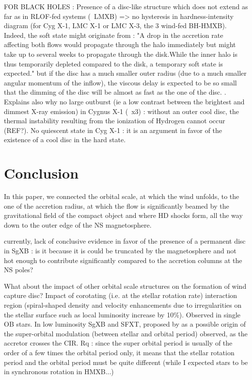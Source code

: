 \documentclass{aa}
\makeatletter
\newcommand{\sgx}{SgXB\xspace}
\newcommand*{\hmxb}{HMXB\@\xspace}
\newcommand*{\ns}{NS\@\xspace}
\newcommand*{\ie}{i.e.\@\xspace}
\makeatother
\begin{document}
FOR BLACK HOLES :
Presence of a disc-like structure which does not extend as far as in RLOF-fed systems (~LMXB) => no hysteresis in hardness-intensity diagram (for Cyg X-1, LMC X-1 or LMC X-3, the 3 wind-fed BH-HMXB). Indeed, the soft state might originate from : "A drop in the accretion rate affecting both flows would propagate through the halo immediately but might take up to several weeks to propagate through the disk.While the inner halo is thus temporarily depleted compared to the disk, a temporary soft state is expected." but if the disc has a much smaller outer radius (due to a much smaller angular momentum of the inflow), the viscous delay is expected to be so small that the dimming of the disc will be almost as fast as the one of the disc. \citep{Smith2002}. Explains also why no large outburst (ie a low contrast between the brightest and dimmest X-ray emission) in Cygnus X-1 (~x3) \citep{Grinberg:2014ux} : without an outer cool disc, the thermal instability resulting from the ionization of Hydrogen cannot occur (REF?). No quiescent state in Cyg X-1 : it is an argument in favor of the existence of a cool disc in the hard state.

\section{Conclusion}
\label{sec:conc}

In this paper, we connected the orbital scale, at which the wind unfolds, to the one of the accretion radius, at which the flow is significantly beamed by the gravitational field of the compact object and where HD shocks form, all the way down to the outer edge of the \ns magnetosphere.  

currently, lack of conclusive evidence in favor of the presence of a permanent disc in \sgx \citep{Bozzo2008,Shakura2012,Romano2015,Hu2017} : is it because it is could be truncated by the magnetosphere and not hot enough to contribute significantly compared to the accretion columns at the NS poles?

What about the impact of other orbital scale structures on the formation of wind capture disc? Impact of corotating (\ie at the stellar rotation rate) interaction region (spiral-shaped density and velocity enhancements due to irregularities on the stellar surface such as local luminosity increase by 10\%). Observed in single OB stars. In low luminosity \sgx and SFXT, proposed by \cite{Bozzo2017a} as a possible origin of the super-orbital modulation (between stellar and orbital period) observed, as the accretor crosses the CIR. Rq : since the super orbital period is usually of the order of a few times the orbital period only, it means that the stellar rotation period and the orbital period must be quite different (while I expected stars to be in synchronous rotation in \hmxb...)
\end{document}
